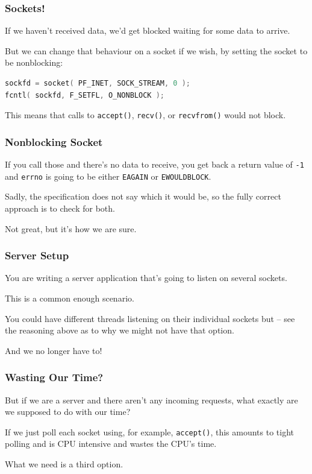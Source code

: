 \begin{frame}[fragile]
	\frametitle{Sockets!}

	If we haven't received data, we'd get blocked waiting for some data to arrive.

	But we can change that behaviour on a socket if we wish, by setting the socket to be nonblocking:

	\begin{lstlisting}[language=C]
sockfd = socket( PF_INET, SOCK_STREAM, 0 );
fcntl( sockfd, F_SETFL, O_NONBLOCK );
\end{lstlisting}

	This means that calls to \texttt{accept()}, \texttt{recv()}, or \texttt{recvfrom()} would not block.

\end{frame}

\begin{frame}
	\frametitle{Nonblocking Socket}

	If you call those and there's no data to receive, you get back a return value of \texttt{-1} and \texttt{errno} is going to be either \texttt{EAGAIN} or \texttt{EWOULDBLOCK}.

	Sadly, the specification does not say which it would be, so the fully correct approach is to check for both.

	Not great, but it's how we are sure.

\end{frame}


\begin{frame}
	\frametitle{Server Setup}

	You are writing a server application that's going to listen on several sockets.

	This is a common enough scenario.

	You could have different threads listening on their individual sockets but -- see the reasoning above as to why we might not have that option.

	And we no longer have to!

\end{frame}


\begin{frame}
	\frametitle{Wasting Our Time?}

	But if we are a server and there aren't any incoming requests, what exactly are we supposed to do with our time?

	If we just poll each socket using, for example, \texttt{accept()}, this amounts to tight polling and is CPU intensive and wastes the CPU's time.

	What we need is a third option.
\end{frame}


